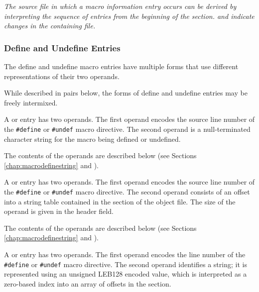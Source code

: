 \textit{The source file in which a macro information entry occurs
can be derived by interpreting the sequence of entries from the
beginning of the \dotdebugmacro{} section. \DWMACROstartfile{} and 
\DWMACROendfile{} indicate changes in the containing file.} 

\subsubsection{Define and Undefine Entries}
\label{chap:defineandundefineentries}
The define and undefine macro entries have multiple forms that
use different representations of their two operands.

While described in pairs below, the forms of define 
and undefine entries may be freely intermixed.

\begin{enumerate}[1. ]

\itembfnl{\DWMACROdefineTARG{}, \DWMACROundefTARG{}}
A \DWMACROdefineNAME{} or \DWMACROundefNAME{} entry has two
operands. The first operand encodes the source line number 
of the \texttt{\#define} or \texttt{\#undef} macro directive.
The second operand is a null-terminated character
string for the macro being defined or undefined. 

The contents of the operands are described below (see Sections 
\ref{chap:macrodefinestring} and ).

\itembfnl{\DWMACROdefinestrpTARG{}, \DWMACROundefstrpTARG{}}
A \DWMACROdefinestrpNAME{} or \DWMACROundefstrpNAME{} 
entry has two operands.  The first operand encodes the source line number
of the \texttt{\#define} or \texttt{\#undef} macro directive. 
The second operand consists of an offset into a string table contained in
the \dotdebugstr{} section of the object file.  The size of the operand is
given in the header \HFNoffsetsizeflag{} field. 

The contents of the operands are described below (see Sections 
\ref{chap:macrodefinestring} and ).

\itembfnl{\DWMACROdefinestrxTARG{}, \DWMACROundefstrxTARG{}}
A \DWMACROdefinestrxNAME{} or \DWMACROundefstrxNAME{} entry 
has two operands.  The first operand encodes the line number 
of the \texttt{\#define} or \texttt{\#undef} macro directive.
The second operand identifies a string; it is represented using an 
unsigned LEB128 encoded value,
which is interpreted as a zero-based index into an array of offsets in the
\dotdebugstroffsets{} section. 


\end{enumerate}
